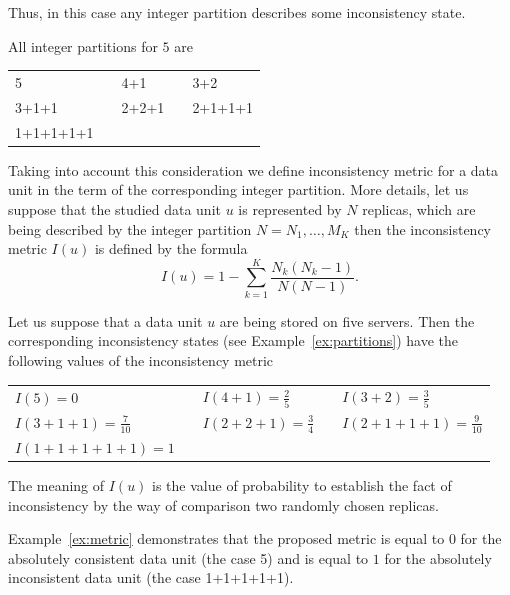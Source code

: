 \documentclass{llncs}
\begin{document}
\noindent Thus, in this case any integer partition describes some inconsistency state.

\begin{example}\label{ex:partitions}
All integer partitions for $5$ are
\begin{center}
\begin{tabular}{lclcl}
	5 & & 4+1 & & 3+2\\
	3+1+1 &\hspace*{10pt}& 2+2+1 &\hspace*{10pt}& 2+1+1+1\\
	1+1+1+1+1
\end{tabular}
\end{center}
\end{example}

Taking into account this consideration we define inconsistency metric for a data unit in the term of the corresponding integer partition.
More details, let us suppose that the studied data unit $u$ is represented by $N$ replicas, which are being described by the integer partition $N=N_1,\ldots,M_K$ then the inconsistency metric $I(u)$ is defined by the formula
\begin{equation}\label{eq:metric}
	I(u)=1-\sum_{k=1}^K\dfrac{N_k(N_k-1)}{N(N-1)}.
\end{equation}

\begin{example}\label{ex:metric}
Let us suppose that a data unit $u$ are being stored on five servers.
Then the corresponding inconsistency states (see Example~\ref{ex:partitions}) have the following values of the inconsistency metric
\begin{center}
\begin{tabular}{lclcl}
	$I(5)=0$ & & $I(4+1)=\frac{2}{5}$ & & $I(3+2)=\frac{3}{5}$\\
	$I(3+1+1)=\frac{7}{10}$ &\hspace*{10pt}& $I(2+2+1)=\frac{3}{4}$
		&\hspace*{10pt}& $I(2+1+1+1)=\frac{9}{10}$\\
	$I(1+1+1+1+1)=1$
\end{tabular}
\end{center}
The meaning of $I(u)$ is the value of probability to establish the fact of inconsistency by the way of comparison two randomly chosen replicas.
\end{example}
Example~\ref{ex:metric} demonstrates that the proposed metric is equal to $0$ for the absolutely consistent data unit (the case 5) and is equal to $1$ for the absolutely inconsistent data unit (the case 1+1+1+1+1).
\end{document}
